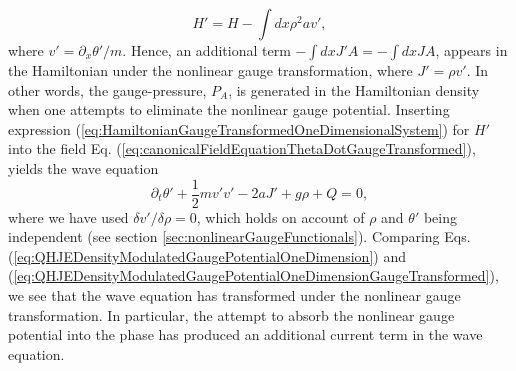 \documentclass[twocolumn, nofootinbib, nobibnotes, amsmath,amssymb,aps, pra, floatfix]{revtex4-1}
\begin{document}
\begin{equation}
  H'=H-\int dx\rho^2 a v',
  \label{eq:HamiltonianGaugeTransformedOneDimensionalSystem}
\end{equation}
where $v'=\partial_x\theta'/m$.
Hence, an additional term $-\int dx J' A=-\int dx J A$, appears in the Hamiltonian under the nonlinear gauge transformation, where $J'=\rho v'$.
In other words, the gauge-pressure, $P_A$, is generated in the Hamiltonian density when one attempts to eliminate the nonlinear gauge potential.
Inserting expression (\ref{eq:HamiltonianGaugeTransformedOneDimensionalSystem}) for $H'$ into the field Eq. (\ref{eq:canonicalFieldEquationThetaDotGaugeTransformed}), yields the wave equation
\begin{equation}
  \partial_t\theta'+\frac{1}{2}m v'v'-2a J'+g\rho+Q=0,
  \label{eq:QHJEDensityModulatedGaugePotentialOneDimensionGaugeTransformed}
\end{equation}
where we have used $\delta v'/\delta\rho=0$, which holds on account of $\rho$ and $\theta'$ being independent (see section \ref{sec:nonlinearGaugeFunctionals}).
Comparing Eqs. (\ref{eq:QHJEDensityModulatedGaugePotentialOneDimension}) and (\ref{eq:QHJEDensityModulatedGaugePotentialOneDimensionGaugeTransformed}), we see that the wave equation has transformed under the nonlinear gauge transformation.
In particular, the attempt to absorb the nonlinear gauge potential into the phase has produced an additional current term in the wave equation.
\end{document}
